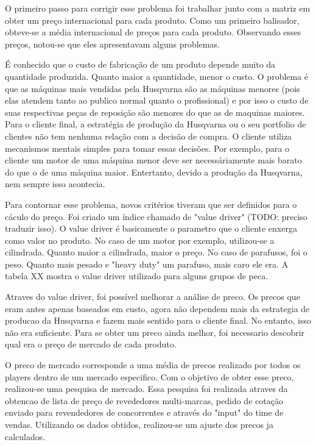 \documentclass[12pt]{article}
\begin{document}
	O primeiro passo para corrigir esse problema foi trabalhar junto com a matriz em obter um preço internacional para cada produto. Como um primeiro balisador, obteve-se a média internacional de preços para cada produto. Observando esses preços, notou-se que eles apresentavam alguns problemas. 

	É conhecido que o custo de fabricação de um produto depende muito da quantidade produzida. Quanto maior a quantidade, menor o custo. O problema é que as máquinas mais vendidas pela Husqvarna são as máquinas menores (pois elas atendem tanto ao publico normal quanto o profissional) e por isso o custo de suas respectivas peças de reposição são menores do que as de maquinas maiores. Para o cliente final, a estratégia de produção da Husqvarna ou o seu portfolio de clientes não tem nenhuma relação com a decisão de compra. O cliente utiliza mecanismos mentais simples para tomar essas decisões. Por exemplo, para o cliente um motor de uma máquina menor deve ser necessáriamente mais barato do que o de uma máquina maior. Entertanto, devido a produção da Husqvarna, nem sempre isso acontecia.

	Para contornar esse problema, novos critérios tiveram que ser definidos para o cáculo do preço. Foi criado um índice chamado de "value driver" (TODO: preciso traduzir isso). O value driver é basicamente o parametro que o cliente enxerga como valor no produto. No caso de um motor por exemplo, utilizou-se a cilindrada. Quanto maior a cilindrada, maior o preço. No caso de parafusos, foi o peso. Quanto mais pesado e "heavy duty" um parafuso, mais caro ele era. A tabela XX mostra o value driver utilizado para alguns grupos de peca.


	Atraves do value driver, foi possível melhorar a análise de preco. Os precos que eram antes apenas baseados em custo, agora não dependem mais da estrategia de producao da Husqvarna e fazem mais sentido para o cliente final. No entanto, isso não era suficiente. Para se obter um preco ainda melhor, foi necessario descobrir qual era o preço de mercado de cada produto.

	O preco de mercado corresponde a uma média de precos realizado por todos os players dentro de um mercado especifico. Com o objetivo de obter esse preco, realizou-se uma pesquisa de mercado. Essa pesquisa foi realizada atraves da obtencao de lista de preço de revededores multi-marcas, pedido de cotação enviado para revendedores de concorrentes e através do "input" do time de vendas. Utilizando os dados obtidos, realizou-se um ajuste dos precos ja calculados.
\end{document}
